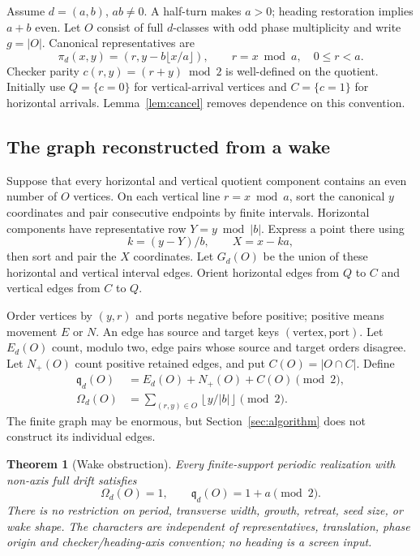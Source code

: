 \documentclass[11pt]{article}
\newtheorem{theorem}{Theorem}
\newcommand{\qd}{\mathfrak q_d}
\newcommand{\Od}{\Omega_d}
\begin{document}
Assume $d=(a,b)$, $ab\ne0$. A half-turn makes $a>0$; heading restoration implies
$a+b$ even. Let $O$ consist of full $d$-classes with odd phase multiplicity and
write $g=|O|$. Canonical representatives are
\[
 \pi_d(x,y)=(r,y-b\lfloor x/a\rfloor),\qquad r=x\bmod a,\quad 0\le r<a.
\]
Checker parity $c(r,y)=(r+y)\bmod2$ is well-defined on the quotient. Initially
use $Q=\{c=0\}$ for vertical-arrival vertices and $C=\{c=1\}$ for horizontal
arrivals. Lemma~\ref{lem:cancel} removes dependence on this convention.

\subsection{The graph reconstructed from a wake}
Suppose that every horizontal and vertical quotient component contains an even
number of $O$ vertices. On each vertical line $r=x\bmod a$, sort the canonical
$y$ coordinates and pair consecutive endpoints by finite intervals. Horizontal
components have representative row $Y=y\bmod |b|$. Express a point there using
\[
 k=(y-Y)/b,\qquad X=x-ka,
\]
then sort and pair the $X$ coordinates. Let $G_d(O)$ be the union of these
horizontal and vertical interval edges. Orient horizontal edges from $Q$ to
$C$ and vertical edges from $C$ to $Q$.

Order vertices by $(y,r)$ and ports negative before positive; positive means
movement $E$ or $N$. An edge has source and target keys $(\text{vertex},\text{port})$.
Let $E_d(O)$ count, modulo two, edge pairs whose source and target orders disagree.
Let $N_+(O)$ count positive retained edges, and put $C(O)=|O\cap C|$. Define
\begin{align}
 \qd(O)&=E_d(O)+N_+(O)+C(O)\pmod2,\label{eq:character}\\
 \Od(O)&=\sum_{(r,y)\in O}\left\lfloor y/|b|\right\rfloor\pmod2.
 \label{eq:winding}
\end{align}
The finite graph may be enormous, but Section~\ref{sec:algorithm} does not
construct its individual edges.

\begin{theorem}[Wake obstruction]\label{thm:main}
Every finite-support periodic realization with non-axis full drift satisfies
\[
 \boxed{\Od(O)=1,\qquad \qd(O)=1+a\pmod2.}
\]
There is no restriction on period, transverse width, growth, retreat, seed size,
or wake shape. The characters are independent of representatives, translation,
phase origin and checker/heading-axis convention; no heading is a screen input.
\end{theorem}
\end{document}
